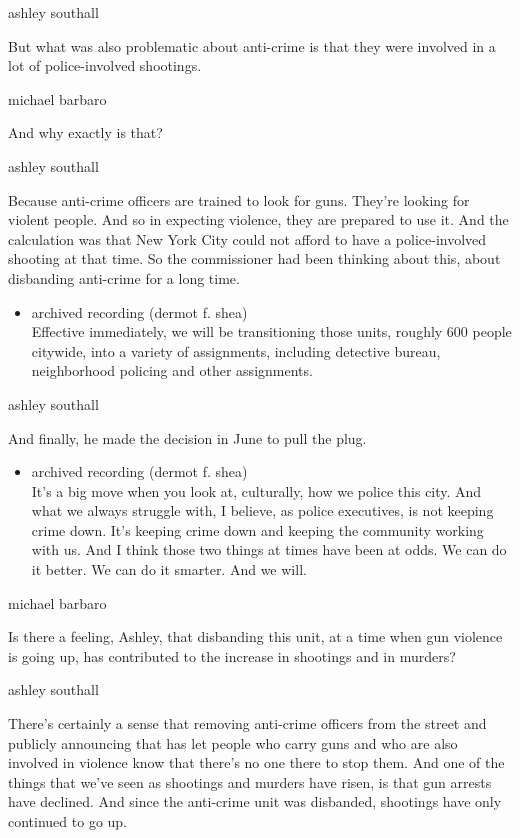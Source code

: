 ashley southall

But what was also problematic about anti-crime is that they were
involved in a lot of police-involved shootings.

michael barbaro

And why exactly is that?

ashley southall

Because anti-crime officers are trained to look for guns. They're
looking for violent people. And so in expecting violence, they are
prepared to use it. And the calculation was that New York City could not
afford to have a police-involved shooting at that time. So the
commissioner had been thinking about this, about disbanding anti-crime
for a long time.

\begin{itemize}
\tightlist
\item
  archived recording (dermot f. shea)\\
  Effective immediately, we will be transitioning those units, roughly
  600 people citywide, into a variety of assignments, including
  detective bureau, neighborhood policing and other assignments.
\end{itemize}

ashley southall

And finally, he made the decision in June to pull the plug.

\begin{itemize}
\tightlist
\item
  archived recording (dermot f. shea)\\
  It's a big move when you look at, culturally, how we police this city.
  And what we always struggle with, I believe, as police executives, is
  not keeping crime down. It's keeping crime down and keeping the
  community working with us. And I think those two things at times have
  been at odds. We can do it better. We can do it smarter. And we will.
\end{itemize}

michael barbaro

Is there a feeling, Ashley, that disbanding this unit, at a time when
gun violence is going up, has contributed to the increase in shootings
and in murders?

ashley southall

There's certainly a sense that removing anti-crime officers from the
street and publicly announcing that has let people who carry guns and
who are also involved in violence know that there's no one there to stop
them. And one of the things that we've seen as shootings and murders
have risen, is that gun arrests have declined. And since the anti-crime
unit was disbanded, shootings have only continued to go up.

